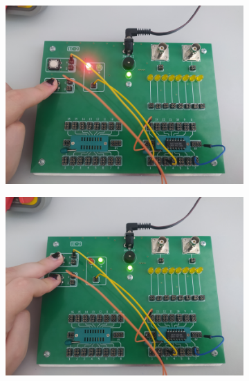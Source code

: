 \begin{itemize}
\begin{figure}[H]
\begin{subfigure}[h]{0.4\textwidth}
                    \includegraphics[width=\textwidth]{img/XOR/test/1652306732707_scaled.png}
                \end{subfigure}
                \begin{subfigure}[h]{0.4\textwidth}
                    \includegraphics[width=\textwidth]{img/XOR/test/1652306732690_scaled.png}
                \end{subfigure}
        \end{figure}

\pagebreak


\end{itemize}
